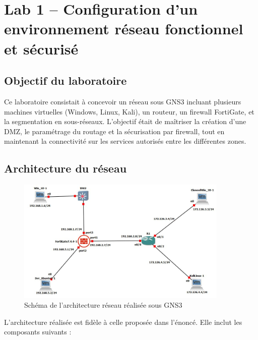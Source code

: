 \documentclass[12pt,a4paper]{article}
\begin{document}
	\tableofcontents
	\newpage
	
	\section{Lab 1 – Configuration d'un environnement réseau fonctionnel et sécurisé}
	
	\subsection{Objectif du laboratoire}
	Ce laboratoire consistait à concevoir un réseau sous GNS3 incluant plusieurs machines virtuelles (Windows, Linux, Kali), un routeur, un firewall FortiGate, et la segmentation en sous-réseaux. L'objectif était de maîtriser la création d'une DMZ, le paramétrage du routage et la sécurisation par firewall, tout en maintenant la connectivité sur les services autorisés entre les différentes zones.
	
	\subsection{Architecture du réseau}
	
	\begin{figure}[H]
		\centering
		\includegraphics[width=0.9\textwidth]{image0.jpeg}
		\caption{Schéma de l'architecture réseau réalisée sous GNS3}
		\label{fig:architecture}
	\end{figure}
	
	L'architecture réalisée est fidèle à celle proposée dans l'énoncé. Elle inclut les composants suivants :
	
\end{document}
